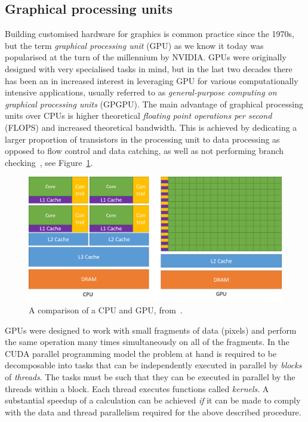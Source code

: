 \documentclass[final,3p,times,twocolumn]{elsarticle}
\begin{document}
		
	\subsection{Graphical processing units}
	Building customised hardware for graphics is common practice since the 1970s, but the term \emph{graphical processing unit} (GPU) as we know it today was popularised at the turn of the millennium by NVIDIA. GPUs were originally designed with very specialised tasks in mind, but in the last two decades there has been an in increased interest in leveraging GPU for various computationally intensive applications, usually referred to as \emph{general-purpose computing on graphical processing units} (GPGPU). The main advantage of graphical processing units over CPUs is higher theoretical \emph{floating point operations per second} (FLOPS) and increased theoretical bandwidth. This is achieved by dedicating a larger proportion of transistors in the processing unit to data processing as opposed to flow control and data catching, as well as not performing branch checking~\cite{cuda}, see Figure~\ref{fig:cuda-gpu}.
	\begin{figure}[h]
		\centering
		\includegraphics[width=\linewidth]{../diagrams/cuda-gpu}
		\caption{A comparison of a CPU and GPU, from~\cite{cuda}.}
		\label{fig:cuda-gpu}
	\end{figure}
	GPUs were designed to work with small fragments of data (pixels) and perform the same operation many times simultaneously on all of the fragments. In the CUDA parallel programming model the problem at hand is required to be decomposable into tasks that can be independently executed in parallel by \emph{blocks} of \emph{threads}. The tasks must be such that they can be executed in parallel by the threads within a block. Each thread executes functions called \emph{kernels}. A substantial speedup of a calculation can be achieved \emph{if} it can be made to comply with the data and thread parallelism required for the above described procedure. 
	
\end{document}

